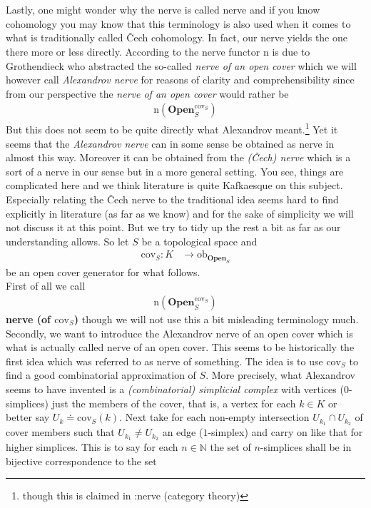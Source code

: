 \\\\
Lastly, one might wonder why the nerve is called nerve and if you know cohomology you may know that this terminology is also used when it comes to what is traditionally called \v{C}ech cohomology. In fact, our nerve yields the one there more or less directly. According to \cite{wiki-nlab0000} the nerve functor $\mathrm{n}$ is due to Grothendieck who abstracted the so-called \textit{nerve of an open cover} which we will however call \textit{Alexandrov nerve} for reasons of clarity and comprehensibility since from our perspective the \textit{nerve of an open cover} would rather be
\begin{align*}
  \mathrm{n}
  \left(
    \mathbf{Open}_{S}^{\mathrm{cov}_{S}}
  \right)
\end{align*}
But this does not seem to be quite directly what Alexandrov meant.\footnote{though this is claimed in \cite{wiki-pedia0en}:nerve (category theory)} Yet it seems that the \textit{Alexandrov nerve} can in some sense be obtained as nerve in almost this way. Moreover it can be obtained from the \textit{(\v{C}ech) nerve} which is a sort of a nerve in our sense but in a more general setting. You see, things are complicated here and we think literature is quite Kafkaesque on this subject. Especially relating the \v{C}ech nerve to the traditional idea seems hard to find explicitly in literature (as far as we know) and for the sake of simplicity we will not discuss it at this point. But we try to tidy up the rest a bit as far as our understanding allows. So let $S$ be a topological space and
\begin{align*}
  \mathrm{cov}_{S}
  \colon
  K
  &\rightarrow
  \mathrm{ob}_{\mathbf{Open}_{S}}
\end{align*}
be an open cover generator for what follows.
\\
First of all we call
\begin{align*}
  \mathrm{n}
  \left(
    \mathbf{Open}_{S}^{\mathrm{cov}_{S}}
  \right)
\end{align*}
\textbf{nerve (of $\mathrm{cov}_{S}$)} though we will not use this a bit misleading terminology much.
\\
Secondly, we want to introduce the Alexandrov nerve of an open cover which is what is actually called nerve of an open cover. This seems to be historically the first idea which was referred to as nerve of something. The idea is to use $\mathrm{cov}_{S}$ to find a good combinatorial approximation of $S$. More precisely, what Alexandrov seems to have invented is a \textit{(combinatorial) simplicial complex} with vertices ($0$-simplices) just the members of the cover, that is, a vertex for each $k \in K$ or better say $U_{k} \doteq \mathrm{cov}_{S}(k)$. Next take for each non-empty intersection $U_{k_{1}} \cap U_{k_{2}}$ of cover members such that $U_{k_{1}} \neq U_{k_{2}}$ an edge ($1$-simplex) and carry on like that for higher simplices. This is to say for each $n \in \mathbb{N}$ the set of $n$-simplices shall be in bijective correspondence to the set

